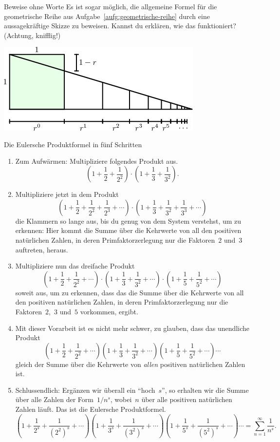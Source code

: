 \documentclass[twoside]{../zirkelblatt1415}
\theoremstyle{definition}
\theoremstyle{plain}
\theoremstyle{remark}
\begin{document}
\begin{aufgabe}{Beweise ohne Worte}
Es ist sogar möglich, die allgemeine Formel für die geometrische Reihe aus
Aufgabe~\ref{aufg:geometrische-reihe} durch eine aussagekräftige Skizze zu
beweisen. Kannst du erklären, wie das funktioniert? (Achtung, knifflig!)
\begin{center}
  \includegraphics[scale=0.5]{geometrische-reihe-6}
\end{center}
\end{aufgabe}

\begin{aufgabe}{Die Eulersche Produktformel in fünf Schritten}
\label{aufg:euler-produkt}
\begin{enumerate}
\item Zum Aufwärmen: Multipliziere folgendes Produkt aus.
\[ \left(1 + \frac{1}{2} + \frac{1}{2^2}\right) \cdot
  \left(1 + \frac{1}{3} + \frac{1}{3^2}\right). \]
\item Multipliziere jetzt in dem Produkt
\[ \left(1 + \frac{1}{2} + \frac{1}{2^2} + \frac{1}{2^3} + \cdots\right) \cdot
  \left(1 + \frac{1}{3} + \frac{1}{3^2} + \frac{1}{3^3} + \cdots\right) \]
die Klammern so lange aus, bis du genug von dem System verstehst, um zu
erkennen: Hier kommt die Summe über die Kehrwerte von all den positiven
natürlichen Zahlen, in deren Primfaktorzerlegung nur die Faktoren~$2$ und~$3$
auftreten, heraus.
\item Multipliziere nun das dreifache Produkt
\[ \left(1 + \frac{1}{2} + \frac{1}{2^2} + \cdots\right) \cdot
  \left(1 + \frac{1}{3} + \frac{1}{3^2} + \cdots\right) \cdot
  \left(1 + \frac{1}{5} + \frac{1}{5^2} + \cdots\right) \]
soweit aus, um zu erkennen, dass das die Summe über die Kehrwerte von all den
positiven natürlichen Zahlen, in deren Primfaktorzerlegung nur die Faktoren~$2$,~$3$
und~$5$ vorkommen, ergibt.
\item Mit dieser Vorarbeit ist es nicht mehr schwer, zu glauben, dass das
unendliche Produkt
\[ \left(1 + \frac{1}{2} + \frac{1}{2^2} + \cdots\right)
  \left(1 + \frac{1}{3} + \frac{1}{3^2} + \cdots\right)
  \left(1 + \frac{1}{5} + \frac{1}{5^2} + \cdots\right) \cdots \]
gleich der Summe über die Kehrwerte von \emph{allen} positiven natürlichen Zahlen ist.
\item Schlussendlich: Ergänzen wir überall ein "`hoch~$s$"', so erhalten wir
die Summe über alle Zahlen der Form~$1/n^s$, wobei~$n$ über alle positiven
natürlichen Zahlen läuft. Das ist die Eulersche Produktformel.
\[\textstyle \left(1 + \frac{1}{2^s} + \frac{1}{(2^2)^s} + \cdots\right)
  \left(1 + \frac{1}{3^s} + \frac{1}{(3^2)^s} + \cdots\right)
  \left(1 + \frac{1}{5^s} + \frac{1}{(5^2)^s} + \cdots\right) \cdots =
  \sum_{n=1}^\infty \frac{1}{n^s}. \]
\end{enumerate}\fixlistspacing
\end{aufgabe}
\end{document}
